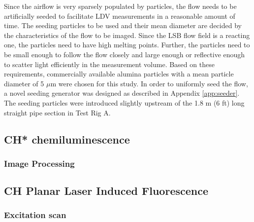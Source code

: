 Since the airflow is very sparsely populated by particles, the flow needs to be artificially seeded to facilitate LDV measurements in a reasonable amount of time.
The seeding particles to be used and their mean diameter are decided by the characteristics of the flow to be imaged.
Since the LSB flow field is a reacting one, the particles need to have high melting points.
Further, the particles need to be small enough to follow the flow closely and large enough or reflective enough to scatter light efficiently in the measurement volume.
Based on these requirements, commercially available alumina particles with a mean particle diameter of 5 \(\mu\)m were chosen for this study.
In order to uniformly seed the flow, a novel seeding generator was designed as described in Appendix \ref{app:seeder}.
The seeding particles were introduced slightly upstream of the 1.8 m (6 ft) long straight pipe section in Test Rig A.

\subsection{CH* chemiluminescence}

\subsubsection{Image Processing}

\subsection{CH Planar Laser Induced Fluorescence}

\subsubsection{Excitation scan}
